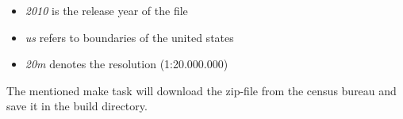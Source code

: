 \begin{itemize}
\item \textit{2010} is the release year of the file
\item \textit{us} refers to boundaries of the united states
\item \textit{20m} denotes the resolution (1:20.000.000)
\end{itemize}

The mentioned make task will download the zip-file from the census bureau and save it in the build directory.

